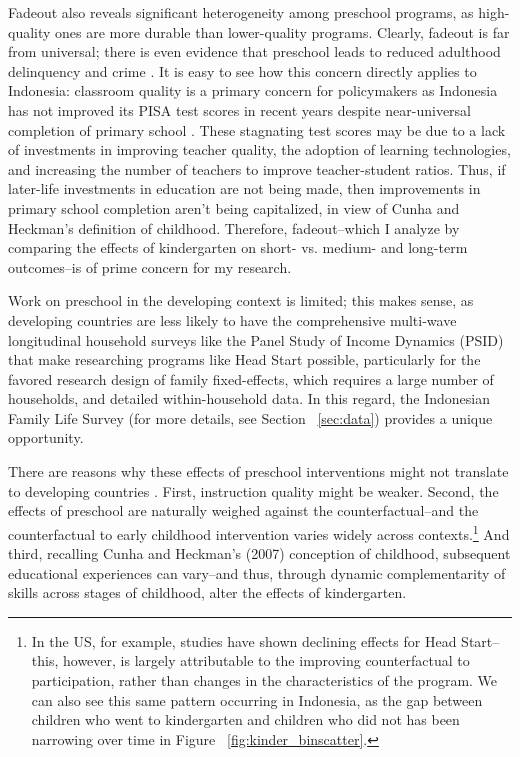 Fadeout also reveals significant heterogeneity among preschool programs, as high-quality ones are more durable than lower-quality programs. Clearly, fadeout is far from universal; there is even evidence that preschool leads to reduced adulthood delinquency and crime \citep{Barnett2008}. It is easy to see how this concern directly applies to Indonesia: classroom quality is a primary concern for policymakers as Indonesia has not improved its PISA test scores in recent years despite near-universal completion of primary school \citep{Afkar2020}. These stagnating test scores may be due to a lack of investments in improving teacher quality, the adoption of learning technologies, and increasing the number of teachers to improve teacher-student ratios. Thus, if later-life investments in education are not being made, then improvements in primary school completion aren't being capitalized, in view of Cunha and Heckman's definition of childhood. Therefore, fadeout--which I analyze by comparing the effects of kindergarten on short- vs. medium- and long-term outcomes--is of prime concern for my research.

Work on preschool in the developing context is limited; this makes sense, as developing countries are less likely to have the comprehensive multi-wave longitudinal household surveys like the Panel Study of Income Dynamics (PSID) that make researching programs like Head Start possible, particularly for the favored research design of family fixed-effects, which requires a large number of households, and detailed within-household data. In this regard, the Indonesian Family Life Survey (for more details, see Section ~\ref{sec:data}) provides a unique opportunity.

There are reasons why these effects of preschool interventions might not translate to developing countries \citep{Dean2020}. First, instruction quality might be weaker. Second, the effects of preschool are naturally weighed against the counterfactual--and the counterfactual to early childhood intervention varies widely across contexts.\footnote{In the US, for example, studies have shown declining effects for Head Start--this, however, is largely attributable to the improving counterfactual to participation, rather than changes in the characteristics of the program. We can also see this same pattern occurring in Indonesia, as the gap between children who went to kindergarten and children who did not has been narrowing over time in Figure ~\ref{fig:kinder_binscatter}.} And third, recalling Cunha and Heckman's (2007) conception of childhood, subsequent educational experiences can vary--and thus, through dynamic complementarity of skills across stages of childhood, alter the effects of kindergarten. 

